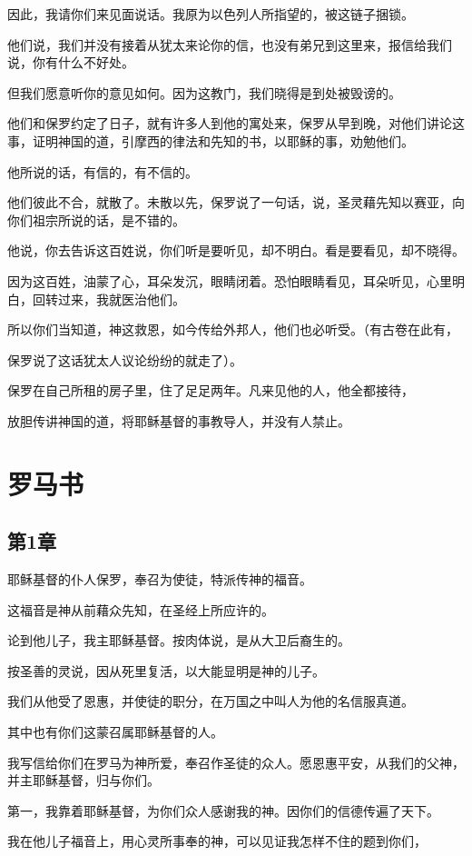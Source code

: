 \documentclass[12pt,oneside]{book}
\begin{document}
因此，我请你们来见面说话。我原为以色列人所指望的，被这链子捆锁。

他们说，我们并没有接着从犹太来论你的信，也没有弟兄到这里来，报信给我们说，你有什么不好处。

但我们愿意听你的意见如何。因为这教门，我们晓得是到处被毁谤的。

他们和保罗约定了日子，就有许多人到他的寓处来，保罗从早到晚，对他们讲论这事，证明神国的道，引摩西的律法和先知的书，以耶稣的事，劝勉他们。

他所说的话，有信的，有不信的。

他们彼此不合，就散了。未散以先，保罗说了一句话，说，圣灵藉先知以赛亚，向你们祖宗所说的话，是不错的。

他说，你去告诉这百姓说，你们听是要听见，却不明白。看是要看见，却不晓得。

因为这百姓，油蒙了心，耳朵发沉，眼睛闭着。恐怕眼睛看见，耳朵听见，心里明白，回转过来，我就医治他们。

所以你们当知道，神这救恩，如今传给外邦人，他们也必听受。（有古卷在此有，

保罗说了这话犹太人议论纷纷的就走了）。

保罗在自己所租的房子里，住了足足两年。凡来见他的人，他全都接待，

放胆传讲神国的道，将耶稣基督的事教导人，并没有人禁止。

\part{罗马书}
\chapter{第1章}
耶稣基督的仆人保罗，奉召为使徒，特派传神的福音。

这福音是神从前藉众先知，在圣经上所应许的。

论到他儿子，我主耶稣基督。按肉体说，是从大卫后裔生的。

按圣善的灵说，因从死里复活，以大能显明是神的儿子。

我们从他受了恩惠，并使徒的职分，在万国之中叫人为他的名信服真道。

其中也有你们这蒙召属耶稣基督的人。

我写信给你们在罗马为神所爱，奉召作圣徒的众人。愿恩惠平安，从我们的父神，并主耶稣基督，归与你们。

第一，我靠着耶稣基督，为你们众人感谢我的神。因你们的信德传遍了天下。

我在他儿子福音上，用心灵所事奉的神，可以见证我怎样不住的题到你们，
\end{document}
